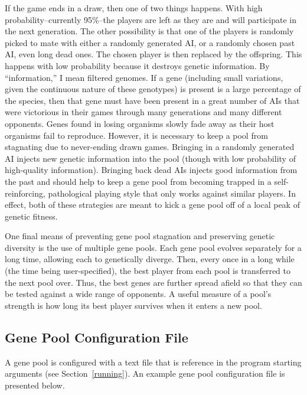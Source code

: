 \documentclass[letterpaper]{article}
\renewcommand{\_}{\allowbreak\textunderscore\allowbreak}
\begin{document}
If the game ends in  a draw, then one of two things happens. With high probability--currently 95\%--the players are left as they are and will participate in the next generation. The other possibility is that one of the players is randomly picked to mate with either a randomly generated AI, or a randomly chosen past AI, even long dead ones. The chosen player is then replaced by the offspring. This happens with low probability because it destroys genetic information. By ``information,'' I mean filtered genomes. If a gene (including small variations, given the continuous nature of these genotypes) is present is a large percentage of the species, then that gene must have been present in a great number of AIs that were victorious in their games through many generations and many different opponents. Genes found in losing organisms slowly fade away as their host organisms fail to reproduce. However, it is necessary to keep a pool from stagnating due to never-ending drawn games. Bringing in a randomly generated AI injects new genetic information into the pool (though with low probability of high-quality information). Bringing back dead AIs injects good information from the past and should help to keep a gene pool from becoming trapped in a self-reinforcing, pathological playing style that only works against similar players. In effect, both of these strategies are meant to kick a gene pool off of a local peak of genetic fitness.

One final means of preventing gene pool stagnation and preserving genetic diversity is the use of multiple gene pools. Each gene pool evolves separately for a long time, allowing each to genetically diverge. Then, every once in a long while (the time being user-specified), the best player from each pool is transferred to the next pool over. Thus, the best genes are further spread afield so that they can be tested against a wide range of opponents. A useful measure of a pool's strength is how long its best player survives when it enters a new pool.

\subsection{Gene Pool Configuration File}
A gene pool is configured with a text file that is reference in the program starting arguments (see Section~\ref{running}). An example gene pool configuration file is presented below.

\end{document}
